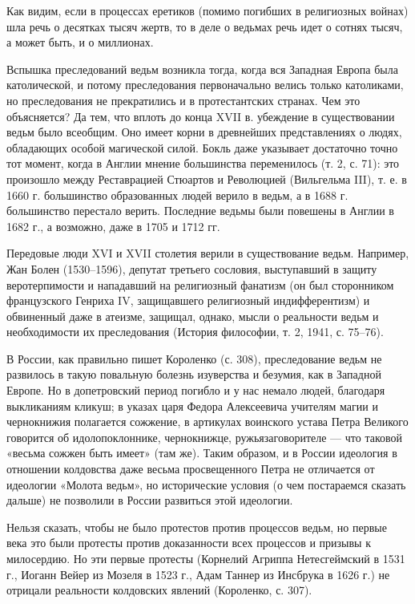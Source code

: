 Как видим, если в процессах еретиков (помимо погибших в религиозных войнах) шла
речь о десятках тысяч жертв, то в деле о ведьмах речь идет о сотнях тысяч, а
может быть, и о миллионах.

Вспышка преследований ведьм возникла тогда, когда вся Западная Европа была
католической, и потому преследования первоначально велись только католиками, но
преследования не прекратились и в протестантских странах. Чем это объясняется?
Да тем, что вплоть до конца XVII в. убеждение в существовании ведьм было
всеобщим. Оно имеет корни в древнейших представлениях о людях, обладающих
особой магической силой. Бокль даже указывает достаточно точно тот момент,
когда в Англии мнение большинства переменилось (т. 2, с. 71): это произошло
между Реставрацией Стюартов и Революцией (Вильгельма III), т. е. в 1660 г.
большинство образованных людей верило в ведьм, а в 1688 г. большинство
перестало верить. Последние ведьмы были повешены в Англии в 1682 г., а
возможно, даже в 1705 и 1712 гг.

Передовые люди XVI и XVII столетия верили в существование ведьм. Например, Жан
Болен (1530--1596), депутат третьего сословия, выступавший в защиту
веротерпимости и нападавший на религиозный фанатизм (он был сторонником
французского Генриха IV, защищавшего религиозный индифферентизм) и обвиненный
даже в атеизме, защищал, однако, мысли о реальности ведьм и необходимости их
преследования (История философии, т. 2, 1941, с. 75--76).

В России, как правильно пишет Короленко (с. 308), преследование ведьм не
развилось в такую повальную болезнь изуверства и безумия, как в Западной
Европе. Но в допетровский период погибло и у нас немало людей, благодаря
выкликаниям кликуш; в указах царя Федора Алексеевича учителям магии и
чернокнижия полагается сожжение, в артикулах воинского устава Петра Великого
говорится об идолопоклоннике, чернокнижце, ружьязаговорителе --- что таковой
«весьма сожжен быть имеет» (там же). Таким образом, и в России идеология в
отношении колдовства даже весьма просвещенного Петра не отличается от идеологии
«Молота ведьм», но исторические условия (о чем постараемся сказать дальше) не
позволили в России развиться этой идеологии.

Нельзя сказать, чтобы не было протестов против процессов ведьм, но первые века
это были протесты против доказанности всех процессов и призывы к милосердию. Но
эти первые протесты (Корнелий Агриппа Нетесгеймский в 1531 г., Иоганн Вейер из
Мозеля в 1523 г., Адам Таннер из Инсбрука в 1626 г.) не отрицали реальности
колдовских явлений (Короленко, с. 307).

